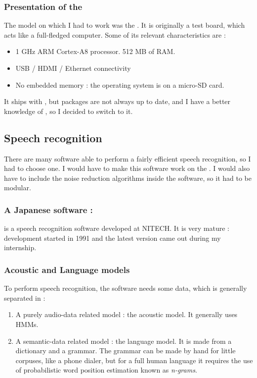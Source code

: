 \subsubsection{Presentation of the }
The model on which I had to work was the . It is originally a  test board, which acts like a full-fledged computer. Some of its relevant characteristics are : 
\begin{itemize}
\item 1 GHz ARM Cortex-A8 processor. 512 MB of RAM.
\item USB / HDMI / Ethernet connectivity
\item No embedded memory : the operating system is on a micro-SD card.
\end{itemize}

It ships with , but packages are not always up to date, and I have a better knowledge of , so I decided to switch to it.

\subsection{Speech recognition}
There are many software able to perform a fairly efficient speech recognition, so I had to choose one. I would have to make this software work on the . I would also have to include the noise reduction algorithms inside the software, so it had to be modular.
\subsubsection{A Japanese software : }
  is a speech recognition software developed at \ac{NITECH}. It is very mature : development started in 1991 and the latest version came out during my internship.
 
\subsubsection{Acoustic and Language models}
To perform speech recognition, the software needs some data, which is generally separated 
in : 
\begin{enumerate}
\item A purely audio-data related model : the acoustic model. It generally uses \acp{HMM}.
\item A semantic-data related model : the language model. It is made from a dictionary and a grammar. The grammar can be made by hand for little corpuses, like a phone dialer, but for a full human language it requires the use of probabilistic word position estimation known as \textit{n-grams}.
\end{enumerate}

